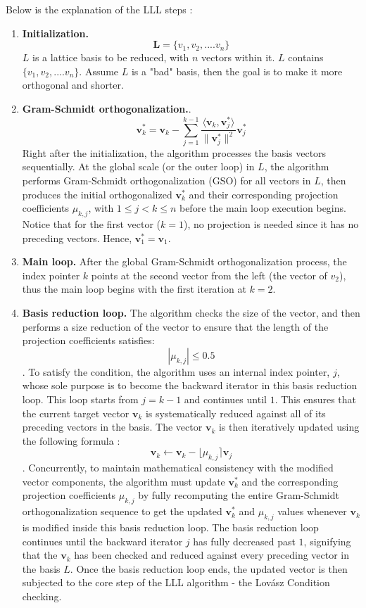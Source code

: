 Below is the explanation of the LLL steps : 
\begin{enumerate}
    \item \textbf{Initialization.} $$\mathbf{L} = \{v_1, v_2, ....v_n\}$$ $L$ is a lattice basis to be reduced, with $n$ vectors within it. $L$ contains ${\{v_1, v_2, ....v_n\}}$. Assume $L$ is a "bad" basis, then the goal is to make it more orthogonal and shorter. 
    \item \textbf{Gram-Schmidt orthogonalization.}. $$\mathbf{v}_k^* = \mathbf{v}_k - \sum_{j=1}^{k-1} \frac{\langle \mathbf{v}_k, \mathbf{v}_j^* \rangle}{\|\mathbf{v}_j^*\|^2} \mathbf{v}_j^*$$
    Right after the initialization, the algorithm processes the basis vectors sequentially. At the global scale (or the outer loop) in $L$, the algorithm performs Gram-Schmidt orthogonalization (GSO) for all vectors in $L$, then produces the initial orthogonalized $\mathbf{v}_k^*$ and their corresponding projection coefficients $\mu_{k,j}$, with $1 \le j < k \le n$ before the main loop execution begins. Notice that for the first vector ($k = 1$), no projection is needed since it has no preceding vectors. Hence, $\mathbf{v}_1^* = \mathbf{v}_1$.
    \item \textbf{Main loop.} After the global Gram-Schmidt orthogonalization process, the index pointer $k$ points at the second vector from the left (the vector of $v_2$), thus the main loop begins with the first iteration at $k=2$.
    \item \textbf{Basis reduction loop.} The algorithm checks the size of the vector, and then performs a size reduction of the vector to ensure that the length of the projection coefficients satisfies: $$|\mu_{k,j}| \leq 0.5$$. To satisfy the condition, the algorithm uses an internal index pointer, $j$, whose sole purpose is to become the backward iterator in this basis reduction loop. This loop starts from $j = k - 1$ and continues until $1$. This ensures that the current target vector $\mathbf{v}_k$ is systematically reduced against all of its preceding vectors in the basis. The vector $\mathbf{v}_k$ is then iteratively updated using the following formula : $$\mathbf{v}_k \leftarrow \mathbf{v}_k - \lfloor\mu_{k,j}\rceil\mathbf{v}_j$$. Concurrently, to maintain mathematical consistency with the modified vector components, the algorithm must update $\mathbf{v}_k^*$ and the corresponding projection coefficients $\mu_{k,j}$ by fully recomputing the entire Gram-Schmidt orthogonalization sequence to get the updated $\mathbf{v}_k^*$ and $\mu_{k,j}$ values whenever $\mathbf{v}_k$ is modified inside this basis reduction loop. The basis reduction loop continues until the backward iterator $j$ has fully decreased past $1$, signifying that the $\mathbf{v}_k$ has been checked and reduced against every preceding vector in the basis $L$. Once the basis reduction loop ends, the updated vector is then subjected to the core step of the LLL algorithm - the Lovász Condition checking.

\end{enumerate}
